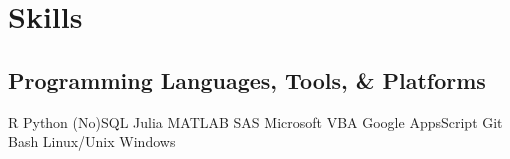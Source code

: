\documentclass[letterpaper]{deedy-resume_sm} %
\begin{document}

\section{Skills}
\subsection{Programming Languages, Tools, \& Platforms}
R \textbullet{} Python \textbullet{} (No)SQL \textbullet{} Julia \textbullet{} MATLAB \textbullet{} SAS \textbullet{} Microsoft VBA \textbullet{} Google AppsScript \textbullet{} Git \textbullet{} Bash \textbullet{} Linux/Unix \textbullet{} Windows
\end{document}
